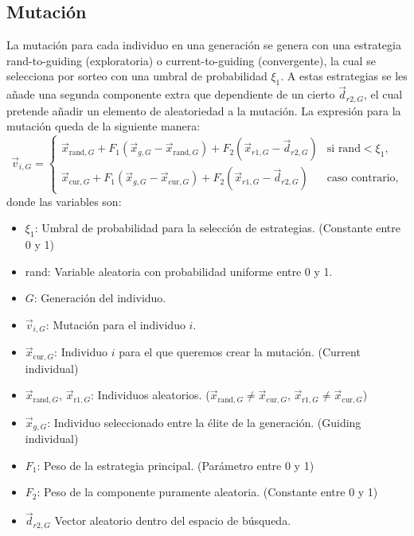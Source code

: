 \documentclass{article}
\begin{document}
\subsection{Mutación}
La mutación para cada individuo en una generación se genera con una estrategia rand-to-guiding (exploratoria) o current-to-guiding (convergente), la cual se selecciona por sorteo con una umbral de probabilidad $\xi_1$. A estas estrategias se les añade una segunda componente extra que dependiente de un cierto $\vec{d}_{r2, G}$, el cual pretende añadir un elemento de aleatoriedad a la mutación. La expresión para la mutación queda de la siguiente manera:
\begin{equation}
    \vec{v}_{i,G} = \left\{\begin{array}{ll}
            \vec{x}_{\text{rand},G} + F_1(\vec{x}_{g,G}-\vec{x}_{\text{rand}, G})+ F_2(\vec{x}_{r1,G}-\vec{d}_{r2, G})&\text{si rand}<\xi_1,\\
            \vec{x}_{\text{cur},G} + F_1(\vec{x}_{g,G}-\vec{x}_{\text{cur}, G})+ F_2(\vec{x}_{r1,G}-\vec{d}_{r2, G})&\text{caso contrario},
    \end{array}\right.
\label{ec_mutacion}
\end{equation}
donde las variables son:
\begin{itemize}
    \item $\xi_1$: Umbral de probabilidad para la selección de estrategias. (Constante entre 0 y 1)
    \item rand: Variable aleatoria con probabilidad uniforme entre 0 y 1.
    \item $G$: Generación del individuo.
    \item $\vec{v}_{i,G}$: Mutación para el individuo $i$.
    \item $\vec{x}_{\text{cur},G}$: Individuo $i$ para el que queremos crear la mutación. (Current individual)
    \item $\vec{x}_{\text{rand},G}$, $\vec{x}_{\text{r1},G}$: Individuos aleatorios. ($\vec{x}_{\text{rand},G}\neq\vec{x}_{\text{cur},G}$, $\vec{x}_{\text{r1},G}\neq\vec{x}_{\text{cur},G}$)
    \item $\vec{x}_{g,G}$: Individuo seleccionado entre la élite de la generación. (Guiding individual)
    \item $F_1$: Peso de la estrategia principal. (Parámetro entre 0 y 1)
    \item $F_2$: Peso de la componente puramente aleatoria. (Constante entre 0 y 1)
    \item $\vec{d}_{r2,G}$ Vector aleatorio dentro del espacio de búsqueda.
\end{itemize}
\end{document}
